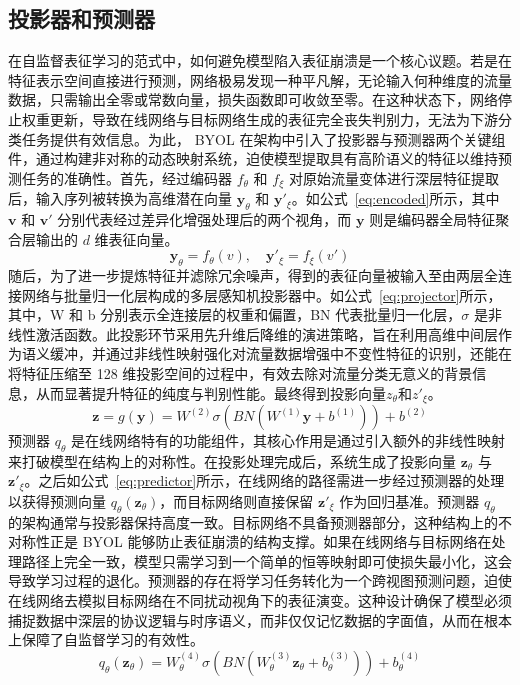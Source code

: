 \subsection{投影器和预测器}
在自监督表征学习的范式中，如何避免模型陷入表征崩溃是一个核心议题。若是在特征表示空间直接进行预测，网络极易发现一种平凡解，无论输入何种维度的流量数据，只需输出全零或常数向量，损失函数即可收敛至零。在这种状态下，网络停止权重更新，导致在线网络与目标网络生成的表征完全丧失判别力，无法为下游分类任务提供有效信息。为此， BYOL 在架构中引入了投影器与预测器两个关键组件，通过构建非对称的动态映射系统，迫使模型提取具有高阶语义的特征以维持预测任务的准确性。首先，经过编码器 $f_\theta$ 和 $f_\xi$ 对原始流量变体进行深层特征提取后，输入序列被转换为高维潜在向量 $\mathbf{y}_\theta$ 和 $\mathbf{y}'_\xi$。如公式~\ref{eq:encoded}所示，其中 $\mathbf{v}$ 和 $\mathbf{v}'$ 分别代表经过差异化增强处理后的两个视角，而 $\mathbf{y}$ 则是编码器全局特征聚合层输出的 $d$ 维表征向量。
\begin{equation}
  \mathbf{y}_\theta = f_\theta(v), \quad \mathbf{y}'_\xi = f_\xi(v')
  \label{eq:encoded}
\end{equation}
随后，为了进一步提炼特征并滤除冗余噪声，得到的表征向量被输入至由两层全连接网络与批量归一化层构成的多层感知机投影器中。如公式~\ref{eq:projector}所示，其中，W 和 b 分别表示全连接层的权重和偏置，BN 代表批量归一化层，$\sigma$ 是非线性激活函数。此投影环节采用先升维后降维的演进策略，旨在利用高维中间层作为语义缓冲，并通过非线性映射强化对流量数据增强中不变性特征的识别，还能在将特征压缩至 128 维投影空间的过程中，有效去除对流量分类无意义的背景信息，从而显著提升特征的纯度与判别性能。最终得到投影向量$z_\theta$和$z'_\xi$。
\begin{equation}
  \mathbf{z} = g(\mathbf{y}) = W^{(2)} \sigma\left(BN\left(W^{(1)} \mathbf{y} + b^{(1)}\right)\right) + b^{(2)}
  \label{eq:projector}
\end{equation}
预测器 $q_\theta$ 是在线网络特有的功能组件，其核心作用是通过引入额外的非线性映射来打破模型在结构上的对称性。在投影处理完成后，系统生成了投影向量 $\mathbf{z}_\theta$ 与 $\mathbf{z}'_\xi$。之后如公式~\ref{eq:predictor}所示，在线网络的路径需进一步经过预测器的处理以获得预测向量 $q_\theta(\mathbf{z}_\theta)$，而目标网络则直接保留 $\mathbf{z}'_\xi$ 作为回归基准。预测器 $q_\theta$ 的架构通常与投影器保持高度一致。目标网络不具备预测器部分，这种结构上的不对称性正是 BYOL 能够防止表征崩溃的结构支撑。如果在线网络与目标网络在处理路径上完全一致，模型只需学习到一个简单的恒等映射即可使损失最小化，这会导致学习过程的退化。预测器的存在将学习任务转化为一个跨视图预测问题，迫使在线网络去模拟目标网络在不同扰动视角下的表征演变。这种设计确保了模型必须捕捉数据中深层的协议逻辑与时序语义，而非仅仅记忆数据的字面值，从而在根本上保障了自监督学习的有效性。
\begin{equation}
  q_\theta(\mathbf{z}_\theta) = W^{(4)}_\theta \sigma\left(BN\left(W^{(3)}_\theta \mathbf{z}_\theta + b^{(3)}_\theta\right)\right) + b^{(4)}_\theta
  \label{eq:predictor}
\end{equation}

